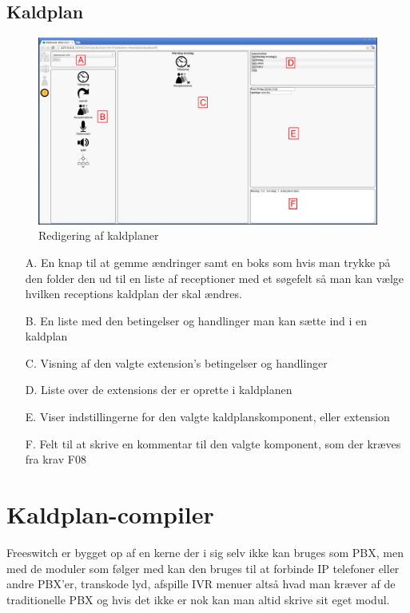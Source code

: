 \pagebreak
\subsection{Kaldplan}
\begin{figure}[ht!]
\centering
\includegraphics[width=\textwidth]{images/screen_dialplan.png}
\caption{Redigering af kaldplaner}
\label{fig:screendialplan}
\end{figure}
\begin{enumerate}
	\item[A.] {En knap til at gemme ændringer samt en boks som hvis man trykke på den folder den ud til en liste af receptioner med et søgefelt så man kan vælge hvilken receptions kaldplan der skal ændres.}
	\item[B.] {En liste med den betingelser og handlinger man kan sætte ind i en kaldplan}
	\item[C.] {Visning af den valgte extension's betingelser og handlinger}
	\item[D.] {Liste over de extensions der er oprette i kaldplanen}
	\item[E.] {Viser indstillingerne for den valgte kaldplanskomponent, eller extension}
	\item[F.] {Felt til at skrive en kommentar til den valgte komponent, som der kræves fra krav F08}
\end{enumerate}

\pagebreak
\section{Kaldplan-compiler}
Freeswitch er bygget op af en kerne der i sig selv ikke kan bruges som PBX, men med de moduler som følger med kan den bruges til at forbinde IP telefoner eller andre PBX'er, transkode lyd, afspille IVR menuer altså hvad man kræver af de traditionelle PBX og hvis det ikke er nok kan man altid skrive sit eget modul.

